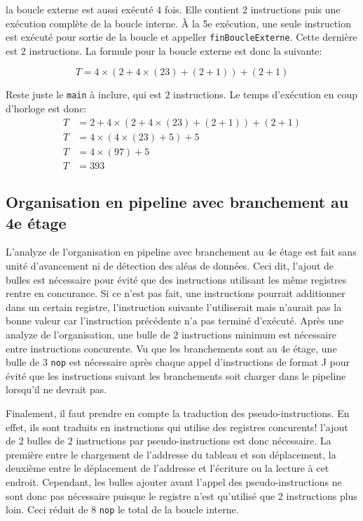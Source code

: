 \documentclass[a11paper]{article}
\newcommand{\todo}[1]{\begin{color}{Red}\textbf{TODO:} #1\end{color}}
\begin{document}
la boucle externe est aussi exécuté $4$ fois. Elle contient $2$ instructions puis une exécution complète de la boucle interne. À la 5e exécution, une seule instruction est exécuté
pour sortie de la boucle et appeller \verb|finBoucleExterne|. Cette dernière est $2$ instructions. La formule pour la boucle externe est donc la suivante:

\begin{equation}
T = 4\times(2+4\times(23)+(2+1)) + (2+1)
\end{equation}

Reste juste le \verb|main| à inclure, qui est $2$ instructions. Le temps d'exécution en coup d'horloge est donc:
\begin{align}
  T &= 2+ 4\times(2+4\times(23)+(2+1)) + (2+1) \\
  T &= 4\times(4\times(23)+5) + 5 \\
  T &= 4\times(97) + 5 \\
  T &= 393
\end{align}

\subsection{Organisation en pipeline avec branchement au 4e étage}


L'analyze de l'organisation en pipeline avec branchement au 4e étage est fait
sans unité d'avancement ni de détection des aléas de données. Ceci dit,
l'ajout de bulles est nécessaire pour évité que des instructions utilisant
les même registres rentre en concurance. Si ce n'est pas fait, une
instructions pourrait additionner dans un certain registre, l'instruction
suivante l'utiliserait mais n'aurait pas la bonne valeur car l'instruction
précédente n'a pas terminé d'exécuté. Après une analyze de l'organisation,
une bulle de $2$ instructions minimum est nécessaire entre instructions
concurente. Vu que les branchements sont au 4e étage, une bulle de $3$
\verb|nop| est nécessaire après chaque appel d'instructions de format J pour
évité que les instructions suivant les branchements soit charger dans le
pipeline lorsqu'il ne devrait pas.

Finalement, il faut prendre en compte la traduction des pseudo-instructions.
En effet, ils sont traduits en instructions qui utilise des registres
concurents! l'ajout de 2 bulles de $2$ instructions par pseudo-instructions
est donc nécessaire. La première entre le chargement de l'addresse du tableau
et son déplacement, la deuxième entre le déplacement de l'addresse et
l'écriture ou la lecture à cet endroit. Cependant, les bulles ajouter avant
l'appel des pseudo-instructions ne sont donc pas nécessaire puisque le
registre n'est qu'utilisé que 2 instructions plus loin. Ceci réduit de 8
\verb|nop| le total de la boucle interne.
\end{document}
